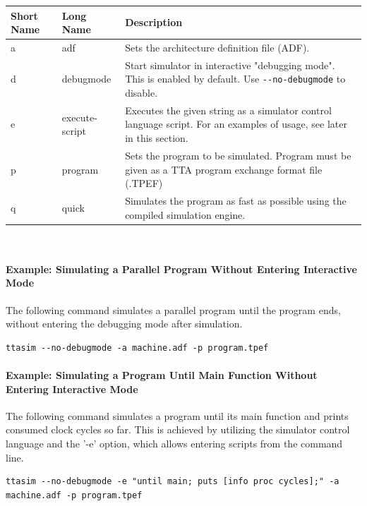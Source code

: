 \documentclass[a4paper,twoside]{tceusermanual}
\begin{document}
\begin{tabular}{p{}p{}
                p{}}
\textbf{Short Name} &\textbf{Long Name} &\textbf{Description} \\
\hline
a & adf & Sets the architecture definition file (ADF). \\
d & debugmode & Start simulator in interactive "debugging mode". This is enabled by default. Use \verb|--no-debugmode| to disable.\\
e & execute-script & Executes the given string as a simulator control language script. For an examples of usage, see later in this section. \\
p & program & Sets the program to be simulated. Program must be given as a TTA program exchange format file (.TPEF) \\
q & quick & Simulates the program as fast as possible using the compiled simulation engine. \\
\end{tabular}\\



\paragraph{Example: Simulating a Parallel Program Without Entering Interactive
Mode}

The following command simulates a parallel program until the program ends,
without entering the debugging mode after simulation.

\begin{verbatim}
ttasim --no-debugmode -a machine.adf -p program.tpef
\end{verbatim}

\paragraph{Example: Simulating a Program Until Main Function Without
Entering Interactive Mode}

The following command simulates a program until its main function and
prints consumed clock cycles so far. This is achieved by utilizing the simulator
control language and the '-e' option, which allows entering scripts 
from the command line.

\begin{verbatim}
ttasim --no-debugmode -e "until main; puts [info proc cycles];" -a machine.adf -p program.tpef
\end{verbatim}
\end{document}
